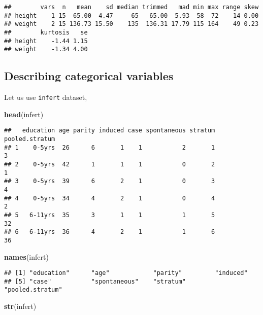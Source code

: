 \documentclass[]{book}
\newenvironment{Shaded}{\begin{snugshade}}{\end{snugshade}}
\newcommand{\KeywordTok}[1]{\textcolor[rgb]{0.13,0.29,0.53}{\textbf{{#1}}}}
\newcommand{\NormalTok}[1]{{#1}}
\theoremstyle{definition}
\theoremstyle{definition}
\theoremstyle{remark}
\begin{document}
\begin{verbatim}
##        vars  n   mean    sd median trimmed   mad min max range skew
## height    1 15  65.00  4.47     65   65.00  5.93  58  72    14 0.00
## weight    2 15 136.73 15.50    135  136.31 17.79 115 164    49 0.23
##        kurtosis   se
## height    -1.44 1.15
## weight    -1.34 4.00
\end{verbatim}

\subsection{Describing categorical
variables}\label{describing-categorical-variables}

Let us use \texttt{infert} dataset,

\begin{Shaded}
\begin{Highlighting}[]
\KeywordTok{head}\NormalTok{(infert)}
\end{Highlighting}
\end{Shaded}

\begin{verbatim}
##   education age parity induced case spontaneous stratum pooled.stratum
## 1    0-5yrs  26      6       1    1           2       1              3
## 2    0-5yrs  42      1       1    1           0       2              1
## 3    0-5yrs  39      6       2    1           0       3              4
## 4    0-5yrs  34      4       2    1           0       4              2
## 5   6-11yrs  35      3       1    1           1       5             32
## 6   6-11yrs  36      4       2    1           1       6             36
\end{verbatim}

\begin{Shaded}
\begin{Highlighting}[]
\KeywordTok{names}\NormalTok{(infert)}
\end{Highlighting}
\end{Shaded}

\begin{verbatim}
## [1] "education"      "age"            "parity"         "induced"       
## [5] "case"           "spontaneous"    "stratum"        "pooled.stratum"
\end{verbatim}

\begin{Shaded}
\begin{Highlighting}[]
\KeywordTok{str}\NormalTok{(infert)}
\end{Highlighting}
\end{Shaded}
\end{document}
